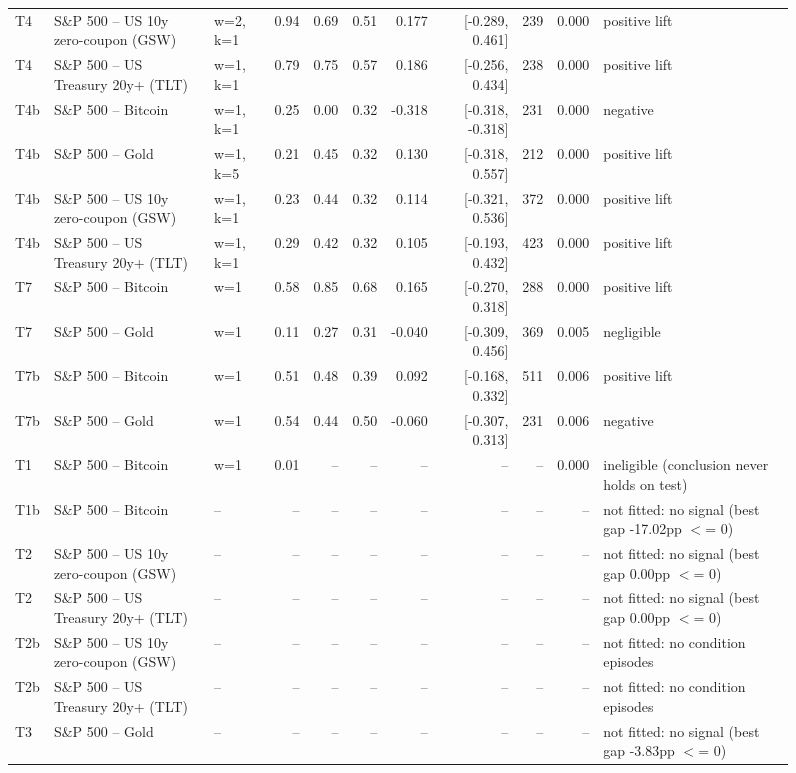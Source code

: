 \begin{figure}
\begin{tabular}{lllrrrrrrrl}
T4 & S\&P 500 -- US 10y zero-coupon (GSW) & w=2, k=1 & 0.94 & 0.69 & 0.51 & 0.177 & [-0.289, 0.461] & 239 & 0.000 & positive lift \\
T4 & S\&P 500 -- US Treasury 20y+ (TLT) & w=1, k=1 & 0.79 & 0.75 & 0.57 & 0.186 & [-0.256, 0.434] & 238 & 0.000 & positive lift \\
T4b & S\&P 500 -- Bitcoin & w=1, k=1 & 0.25 & 0.00 & 0.32 & -0.318 & [-0.318, -0.318] & 231 & 0.000 & negative \\
T4b & S\&P 500 -- Gold & w=1, k=5 & 0.21 & 0.45 & 0.32 & 0.130 & [-0.318, 0.557] & 212 & 0.000 & positive lift \\
T4b & S\&P 500 -- US 10y zero-coupon (GSW) & w=1, k=1 & 0.23 & 0.44 & 0.32 & 0.114 & [-0.321, 0.536] & 372 & 0.000 & positive lift \\
T4b & S\&P 500 -- US Treasury 20y+ (TLT) & w=1, k=1 & 0.29 & 0.42 & 0.32 & 0.105 & [-0.193, 0.432] & 423 & 0.000 & positive lift \\
T7 & S\&P 500 -- Bitcoin & w=1 & 0.58 & 0.85 & 0.68 & 0.165 & [-0.270, 0.318] & 288 & 0.000 & positive lift \\
T7 & S\&P 500 -- Gold & w=1 & 0.11 & 0.27 & 0.31 & -0.040 & [-0.309, 0.456] & 369 & 0.005 & negligible \\
T7b & S\&P 500 -- Bitcoin & w=1 & 0.51 & 0.48 & 0.39 & 0.092 & [-0.168, 0.332] & 511 & 0.006 & positive lift \\
T7b & S\&P 500 -- Gold & w=1 & 0.54 & 0.44 & 0.50 & -0.060 & [-0.307, 0.313] & 231 & 0.006 & negative \\
T1 & S\&P 500 -- Bitcoin & w=1 & 0.01 & -- & -- & -- & -- & -- & 0.000 & ineligible (conclusion never holds on test) \\
T1b & S\&P 500 -- Bitcoin & -- & -- & -- & -- & -- & -- & -- & -- & not fitted: no signal (best gap -17.02pp $<$= 0) \\
T2 & S\&P 500 -- US 10y zero-coupon (GSW) & -- & -- & -- & -- & -- & -- & -- & -- & not fitted: no signal (best gap 0.00pp $<$= 0) \\
T2 & S\&P 500 -- US Treasury 20y+ (TLT) & -- & -- & -- & -- & -- & -- & -- & -- & not fitted: no signal (best gap 0.00pp $<$= 0) \\
T2b & S\&P 500 -- US 10y zero-coupon (GSW) & -- & -- & -- & -- & -- & -- & -- & -- & not fitted: no condition episodes \\
T2b & S\&P 500 -- US Treasury 20y+ (TLT) & -- & -- & -- & -- & -- & -- & -- & -- & not fitted: no condition episodes \\
T3 & S\&P 500 -- Gold & -- & -- & -- & -- & -- & -- & -- & -- & not fitted: no signal (best gap -3.83pp $<$= 0) \\

\end{tabular}
\end{figure}
